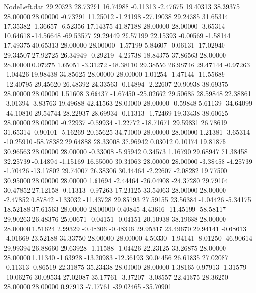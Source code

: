 \begin{filecontents}{NodeLeft.dat}
  29.20323   28.73291   16.74988    -0.11313   -2.47675   19.40313   38.39375   28.00000   28.00000   -0.73291   11.25012   -1.24198  -27.19038
  29.24385   31.65314   17.35382    -1.36657   -6.52356   17.14375   41.87188   28.00000   28.00000   -3.65314   10.64618  -14.56648  -69.53577
  29.29449   29.57199   22.15393    -0.00569   -1.58144   17.49375   40.65313   28.00000   28.00000   -1.57199    5.84607   -0.06131  -17.02940
  29.34507   27.92725   26.34949    -0.29219   -4.26738   18.84375   37.86563   28.00000   28.00000    0.07275    1.65051   -3.31272  -48.38110
  29.38556   26.98746   29.47144    -0.97263   -1.04426   19.98438   34.85625   28.00000   28.00000    1.01254   -1.47144  -11.55689  -12.40795
  29.45620   26.48392   24.33563    -0.14894   -2.22607   20.90938   38.69375   28.00000   28.00000    1.51608    3.66437   -1.67450  -25.02662
  29.50685   28.59848   22.38861    -3.01394   -3.83763   19.49688   42.41563   28.00000   28.00000   -0.59848    5.61139  -34.64099  -44.10810
  29.54744   28.22937   28.69934    -0.11313   -1.72469   19.33438   38.60625   28.00000   28.00000   -0.22937   -0.69934   -1.22772  -18.71671
  29.59831   26.78619   31.65314    -0.90101   -5.16269   20.65625   34.70000   28.00000   28.00000    1.21381   -3.65314  -10.25910  -58.78382
  29.64888   28.33008   33.96942     0.03012    0.10174   19.81875   30.96563   28.00000   28.00000   -0.33008   -5.96942    0.34573    1.16790
  29.68947   31.38458   32.25739    -0.14894   -1.15169   16.65000   30.34063   28.00000   28.00000   -3.38458   -4.25739   -1.70426  -13.17802
  29.74007   26.38306   30.44464    -2.22607   -2.08282   19.77500   30.95000   28.00000   28.00000    1.61694   -2.44464  -26.04908  -24.37280
  29.79104   30.47852   27.12158    -0.11313   -0.97263   17.23125   33.54063   28.00000   28.00000   -2.47852    0.87842   -1.33032  -11.43728
  29.85193   27.59155   23.56384    -1.04426   -5.34175   18.52188   37.61563   28.00000   28.00000    0.40845    4.43616  -11.45199  -58.58117
  29.90263   26.48376   25.00671    -0.04151   -0.04151   20.10938   38.19688   28.00000   28.00000    1.51624    2.99329   -0.48306   -0.48306
  29.95317   23.49670   29.94141    -0.68613   -4.01669   23.52188   34.33750   28.00000   28.00000    4.50330   -1.94141   -8.01250  -46.90614
  29.99394   26.88660   29.63928    -1.11588   -1.04426   22.23125   33.26875   28.00000   28.00000    1.11340   -1.63928  -13.20983  -12.36193
  30.04456   26.61835   27.02087    -0.11313   -0.86519   22.31875   35.23438   28.00000   28.00000    1.38165    0.97913   -1.31579  -10.06276
  30.09534   27.02087   35.17761    -3.37207   -3.08557   22.41875   28.36250   28.00000   28.00000    0.97913   -7.17761  -39.02465  -35.70901

\end{filecontents}
